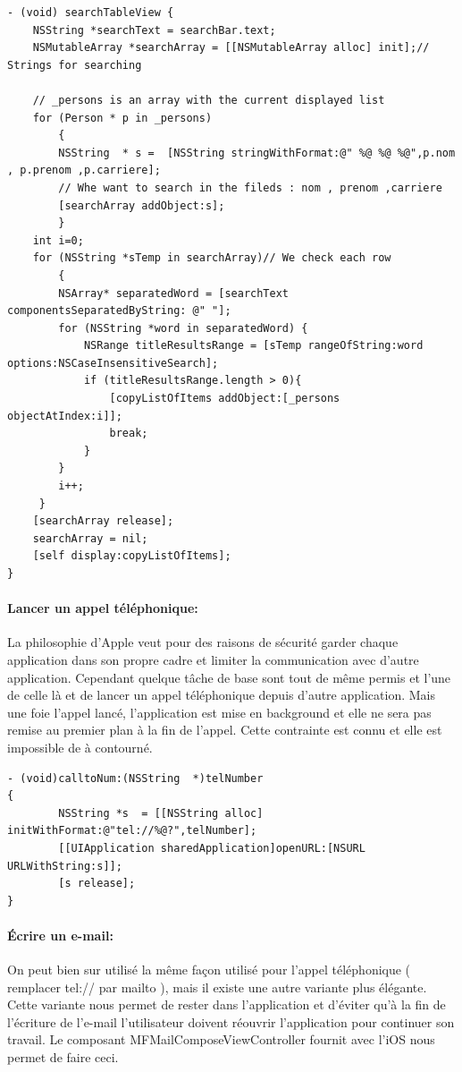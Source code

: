 \begin{lstlisting}[name=Recherche dans UITableView  , label=searchTBV]
- (void) searchTableView {
	NSString *searchText = searchBar.text;
	NSMutableArray *searchArray = [[NSMutableArray alloc] init];// Strings for searching
	
	// _persons is an array with the current displayed list 
	for (Person * p in _persons)
        {
        NSString  * s =  [NSString stringWithFormat:@" %@ %@ %@",p.nom , p.prenom ,p.carriere];
        // Whe want to search in the fileds : nom , prenom ,carriere
		[searchArray addObject:s];
        }
	int i=0;
	for (NSString *sTemp in searchArray)// We check each row
        {
        NSArray* separatedWord = [searchText componentsSeparatedByString: @" "];
        for (NSString *word in separatedWord) {
            NSRange titleResultsRange = [sTemp rangeOfString:word options:NSCaseInsensitiveSearch];
            if (titleResultsRange.length > 0){
                [copyListOfItems addObject:[_persons objectAtIndex:i]];
                break;
            }
        }
        i++;
     }
	[searchArray release];
	searchArray = nil;
	[self display:copyListOfItems];
}
\end{lstlisting}
					\paragraph{Lancer un appel téléphonique:} La philosophie d'Apple veut pour des raisons de sécurité garder chaque application dans son propre cadre et limiter la communication avec d'autre application. Cependant quelque tâche de base sont tout de même permis et l'une de celle là et de lancer un appel téléphonique depuis d'autre application. Mais une foie l'appel lancé, l'application est mise en background et elle ne sera pas remise au premier plan à la fin de l'appel. Cette contrainte est connu et elle est impossible de à contourné.
			\lstset{
				style = Xcode,
				caption=Lancement d'un appel téléphonique sur l'iPhone.,
				breaklines=true,
				frame=single
				}
					
\begin{lstlisting}[name=Recherche dans UITableView  , label=searchTBV]
- (void)calltoNum:(NSString  *)telNumber
{
        NSString *s  = [[NSString alloc] initWithFormat:@"tel://%@?",telNumber];
        [[UIApplication sharedApplication]openURL:[NSURL URLWithString:s]];   
        [s release];
}
\end{lstlisting}
					
			\paragraph{Écrire un e-mail:} On peut bien sur utilisé la même façon utilisé pour l'appel téléphonique ( remplacer tel:// par mailto ), mais il existe une autre variante plus élégante. Cette variante nous permet de rester dans l'application et d'éviter qu'à la fin de l'écriture de l'e-mail l'utilisateur doivent réouvrir l'application pour continuer son travail.  Le composant MFMailComposeViewController fournit avec l'iOS nous permet de faire ceci.
\lstset{
		style = Xcode,
		caption=Ouverture  de la fenêtre d'écriture d'e-mail,
		breaklines=true,
		frame=single
}
				
